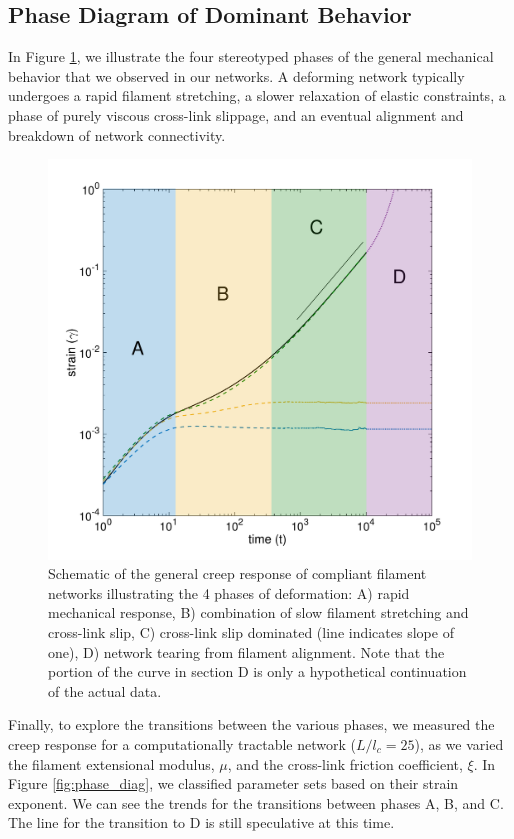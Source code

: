 \documentclass[pre,preprint]{revtex4-1}
\begin{document}
\subsection{Phase Diagram of Dominant Behavior}
In Figure \ref{fig:shear_modes}, we illustrate the four stereotyped phases of the general mechanical behavior that we observed in our networks.  A deforming network typically undergoes a rapid filament stretching, a slower relaxation of elastic constraints, a phase of purely viscous cross-link slippage, and an eventual alignment and breakdown of network connectivity.

\begin{figure}[h!]
\centering
\includegraphics[width=\hsize]{shear_modes_b}
\caption{ \label{fig:shear_modes} Schematic of the general creep response of compliant filament networks illustrating the 4 phases of deformation: A) rapid mechanical response, B) combination of slow filament stretching and cross-link slip, C) cross-link slip dominated (line indicates slope of one), D) network tearing from filament alignment. Note that the portion of the curve in section D is only a hypothetical continuation of the actual data.  }
\end{figure}


Finally, to explore the transitions between the various phases, we measured the creep response for a computationally tractable network ($L/l_c = 25$), as we varied the filament extensional modulus, $\mu$, and the cross-link friction coefficient, $\xi$.  In Figure \ref{fig:phase_diag}, we classified parameter sets based on their strain exponent.  We can see the trends for the transitions between phases A, B, and C.  The line for the transition to D is still speculative at this time.  
\end{document}
